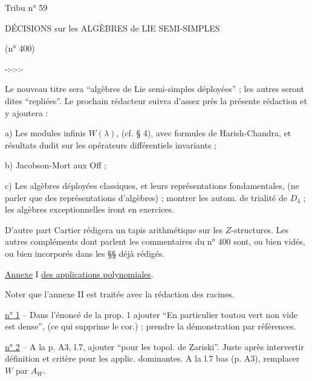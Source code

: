 
\hfill Tribu n° 59

DÉCISIONS sur les ALGÈBRES de LIE SEMI-SIMPLES

(n° 400)

-:-:-:-

Le nouveau titre sera ``algèbres de Lie semi-simples déployées'' ; les autres seront dites ``repliées''. Le prochain rédacteur suivra d'assez près la présente rédaction et y ajoutera :

a) Les modules infinis $W(\lambda)$, (cf. § 4), avec formules de Harish-Chandra, et résultats dudit sur les opérateurs différentiels invariants ;

b) Jacobson-Mort aux Off ;

c) Les algèbres déployées classiques, et leurs représentations fondamentales, (ne parler que des représentations d'algèbres) ; montrer les autom. de trialité de $D_4$ ; les algèbres exceptionnelles iront en exercices.

D'autre part Cartier rédigera un tapis arithmétique sur les $Z$-structures. Les autres compléments dont parlent les commentaires du n° 400 sont, ou bien vidés, ou bien incorporés dans les §§ déjà rédigés.

\uline{Annexe} I \uline{des applications polynomiales}.

Noter que l'annexe II est traitée avec la rédaction des racines.

\uline{n° 1} -- Dans l'énoncé de la prop. 1 ajouter ``En particulier toutou vert non vide est dense'', (ce qui supprime le cor.) ; prendre la démonstration par références.

\uline{n° 2} -- A la p. A3, l.7, ajouter ``pour les topol. de Zariski''. Juste après intervertir définition et critère pour les applic. dominantes. A la l.7 bas (p. A3), remplacer $W$ par $A_W$.
